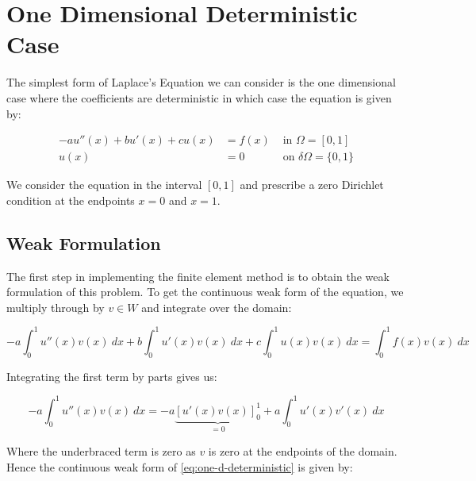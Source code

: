 \chapter{One Dimensional Deterministic Case}

The simplest form of Laplace's Equation we can consider is the one dimensional case where
the coefficients are deterministic in which case the equation is given by:

\begin{equation}
\begin{aligned}
	-au''(x) + bu'(x) + cu(x) &= f(x) &\text{ in } \Omega = [0, 1] \\
                         u(x) &= 0 &\text{ on } \delta\Omega = \{0, 1\}
\end{aligned}
\end{equation}

We consider the equation in the interval $[0,1]$ and prescribe a zero Dirichlet condition at the
endpoints $x = 0$ and $x = 1$.


\section{Weak Formulation}


The first step in implementing the finite element method is to obtain the weak formulation of this
problem. To get the continuous weak form of the equation, we multiply through by $v \in W$ and integrate
over the domain:

\begin{equation}
	-a\int_0^1{u''(x)v(x)\ dx} + b\int_0^1{u'(x)v(x)\ dx} + c\int_0^1{u(x)v(x)\ dx} = 
    \int_0^1{f(x)v(x)\ dx}
\end{equation}

Integrating the first term by parts gives us:

\begin{equation}
	-a\int_0^1{u''(x)v(x)\ dx} = -a\underbrace{[ u'(x)v(x) ]_0^1}_{ = 0}
    	+ a\int_0^1{u'(x)v'(x)\ dx}
\end{equation}

Where the underbraced term is zero as $v$ is zero at the endpoints of the domain. Hence the
continuous weak form of \ref{eq:one-d-deterministic} is given by:

